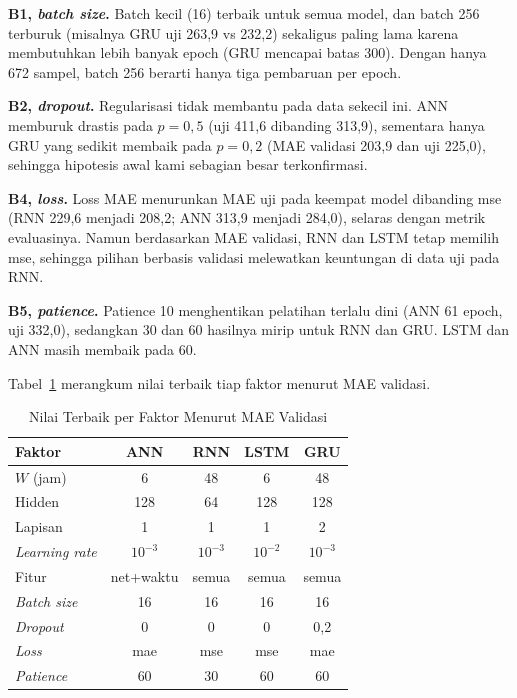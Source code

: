\documentclass[conference,a4paper]{IEEEtran}
\begin{document}
\textbf{B1, \emph{batch size}.} Batch kecil (16) terbaik untuk semua model, dan batch 256 terburuk (misalnya GRU uji 263,9 vs 232,2) sekaligus paling lama karena membutuhkan lebih banyak epoch (GRU mencapai batas 300). Dengan hanya 672 sampel, batch 256 berarti hanya tiga pembaruan per epoch.

\textbf{B2, \emph{dropout}.} Regularisasi tidak membantu pada data sekecil ini. ANN memburuk drastis pada $p=0{,}5$ (uji 411,6 dibanding 313,9), sementara hanya GRU yang sedikit membaik pada $p=0{,}2$ (MAE validasi 203,9 dan uji 225,0), sehingga hipotesis awal kami sebagian besar terkonfirmasi.

\textbf{B4, \emph{loss}.} Loss MAE menurunkan MAE uji pada keempat model dibanding mse (RNN 229,6 menjadi 208,2; ANN 313,9 menjadi 284,0), selaras dengan metrik evaluasinya. Namun berdasarkan MAE validasi, RNN dan LSTM tetap memilih mse, sehingga pilihan berbasis validasi melewatkan keuntungan di data uji pada RNN.

\textbf{B5, \emph{patience}.} Patience 10 menghentikan pelatihan terlalu dini (ANN 61 epoch, uji 332,0), sedangkan 30 dan 60 hasilnya mirip untuk RNN dan GRU. LSTM dan ANN masih membaik pada 60.

Tabel~\ref{tab:best} merangkum nilai terbaik tiap faktor menurut MAE validasi.

\begin{table}[t]
\centering
\caption{Nilai Terbaik per Faktor Menurut MAE Validasi}
\label{tab:best}
\footnotesize
\setlength{\tabcolsep}{3pt}
\begin{tabular}{@{}lcccc@{}}
\toprule
Faktor & ANN & RNN & LSTM & GRU \\
\midrule
$W$ (jam)         & 6    & 48  & 6    & 48 \\
Hidden            & 128  & 64  & 128  & 128 \\
Lapisan           & 1    & 1   & 1    & 2 \\
\emph{Learning rate} & $10^{-3}$ & $10^{-3}$ & $10^{-2}$ & $10^{-3}$ \\
Fitur             & net+waktu & semua & semua & semua \\
\emph{Batch size} & 16   & 16  & 16   & 16 \\
\emph{Dropout}    & 0    & 0   & 0    & 0,2 \\
\emph{Loss}       & mae  & mse & mse  & mae \\
\emph{Patience}   & 60   & 30  & 60   & 60 \\
\bottomrule
\end{tabular}
\end{table}
\end{document}
